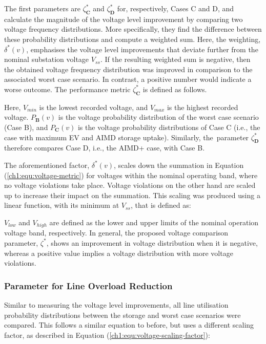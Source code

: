 The first parameters are $\zeta^{*}_\textbf{C}$ and $\zeta^{*}_\textbf{D}$ for, respectively, Cases {C} and {D}, and calculate the magnitude of the voltage level improvement by comparing two voltage frequency distributions. More specifically, they find the difference between these probability distributions and compute a weighted sum. Here, the weighting, $\delta^{*}(v)$, emphasises the voltage level improvements that deviate further from the nominal substation voltage $V_{ss}$. If the resulting weighted sum is negative, then the obtained voltage frequency distribution was improved in comparison to the associated worst case scenario. In contrast, a positive number would indicate a worse outcome. The performance metric $\zeta^{*}_\textbf{C}$ is defined as follows.



Here, $V_{min}$ is the lowest recorded voltage, and $V_{max}$ is the highest recorded voltage. $P_\textbf{B}(v)$ is the voltage probability distribution of the worst case scenario (Case {B}), and $P_\textbf{C}(v)$ is the voltage probability distributions of Case {C} (i.e., the case with maximum EV and AIMD storage uptake). Similarly, the~parameter $\zeta_\textbf{D}^*$ therefore compares Case {D}, i.e., the AIMD+ case, with Case {B}.

The aforementioned factor, $\delta^{*}(v)$, scales down the summation in Equation (\ref{ch1:equ:voltage-metric}) for voltages within the nominal operating band, where no voltage violations take place. Voltage violations on the other hand are scaled up to increase their impact on the summation. This scaling was produced using a linear function, with its minimum at $V_{ss}$, that is defined as:



$V_{low}$ and $V_{high}$ are defined as the lower and upper limits of the nominal operation voltage band, respectively. In general, the proposed voltage comparison parameter, $\zeta^*$, shows an improvement in voltage distribution when it is negative, whereas a positive value implies a voltage distribution with more voltage violations.

\subsubsection{Parameter for Line Overload Reduction}

Similar to measuring the voltage level improvements, all line utilisation probability distributions between the storage and worst case scenarios were compared. This follows a similar equation to before, but uses a different scaling factor, as described in Equation (\ref{ch1:equ:voltage-scaling-factor}):

